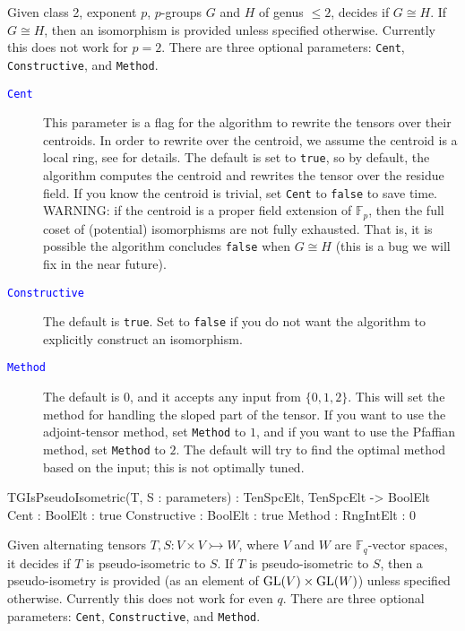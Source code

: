 \documentclass{documentation}
\DeclareMathOperator{\GL}{{\rm GL}}
\begin{document}
Given class 2, exponent $p$, $p$-groups $G$ and $H$ of genus $\leq 2$, decides if $G\cong H$.
If $G\cong H$, then an isomorphism is provided unless specified otherwise.
Currently this does not work for $p=2$.  
There are three optional parameters: {\tt Cent}, {\tt Constructive}, and {\tt Method}.

\begin{description}
\item[\textcolor{blue}{\tt Cent}]
This parameter is a flag for the algorithm to rewrite the tensors over their centroids. 
In order to rewrite over the centroid, we assume the centroid is a local ring, see \cite{eMAGma} for details.
The default is set to {\tt true}, so by default, the algorithm computes the centroid and rewrites the tensor over the residue field.
If you know the centroid is trivial, set {\tt Cent} to {\tt false} to save time.
WARNING: if the centroid is a proper field extension of $\mathbb{F}_p$, then the full coset of (potential) isomorphisms are not fully exhausted. 
That is, it is possible the algorithm concludes {\tt false} when $G\cong H$ (this is a bug we will fix in the near future).
\item[\textcolor{blue}{\tt Constructive}]
The default is {\tt true}. 
Set to {\tt false} if you do not want the algorithm to explicitly construct an isomorphism.
\item[\textcolor{blue}{\tt Method}]
The default is $0$, and it accepts any input from $\{ 0,1,2\}$. 
This will set the method for handling the sloped part of the tensor.
If you want to use the adjoint-tensor method, set {\tt Method} to $1$, and if you want to use the Pfaffian method, set {\tt Method} to $2$. The default will try to find the optimal method based on the input; this is not optimally tuned.
\end{description}

\begin{intrinsics}
TGIsPseudoIsometric(T, S : parameters) : TenSpcElt, TenSpcElt -> BoolElt
    Cent : BoolElt : true
    Constructive : BoolElt : true
    Method : RngIntElt : 0
\end{intrinsics}

\color{black}
Given alternating tensors $T, S : V\times V \rightarrowtail W$, where $V$ and $W$ are $\mathbb{F}_q$-vector spaces, it decides if $T$ is pseudo-isometric to $S$.
If $T$ is pseudo-isometric to $S$, then a pseudo-isometry is provided (as an element of $\GL(V)\times \GL(W)$) unless specified otherwise. 
Currently this does not work for even $q$. 
There are three optional parameters: {\tt Cent}, {\tt Constructive}, and {\tt Method}.
\end{document}
